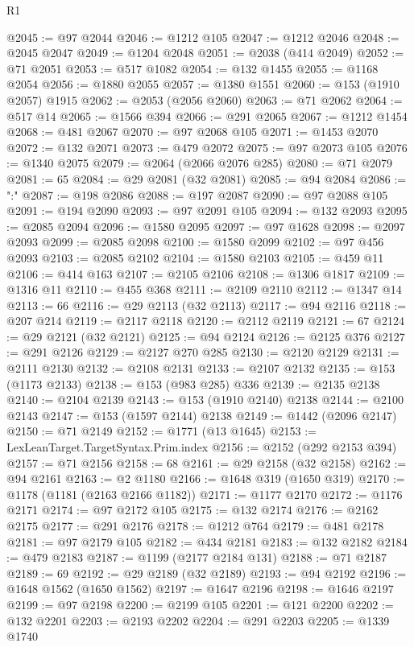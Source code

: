 \begin{lexlean}{R1}
\begin{coremodule}
@2045 := @97 @2044
@2046 := @1212 @105
@2047 := @1212 @2046
@2048 := @2045 @2047
@2049 := @1204 @2048
@2051 := @2038 (@414 @2049)
@2052 := @71 @2051
@2053 := @517 @1082
@2054 := @132 @1455
@2055 := @1168 @2054
@2056 := @1880 @2055
@2057 := @1380 @1551
@2060 := @153 (@1910 @2057) @1915
@2062 := @2053 (@2056 @2060)
@2063 := @71 @2062
@2064 := @517 @14
@2065 := @1566 @394
@2066 := @291 @2065
@2067 := @1212 @1454
@2068 := @481 @2067
@2070 := @97 @2068 @105
@2071 := @1453 @2070
@2072 := @132 @2071
@2073 := @479 @2072
@2075 := @97 @2073 @105
@2076 := @1340 @2075
@2079 := @2064 (@2066 @2076 @285)
@2080 := @71 @2079
@2081 := 65
@2084 := @29 @2081 (@32 @2081)
@2085 := @94 @2084
@2086 := ":"
@2087 := @198 @2086
@2088 := @197 @2087
@2090 := @97 @2088 @105
@2091 := @194 @2090
@2093 := @97 @2091 @105
@2094 := @132 @2093
@2095 := @2085 @2094
@2096 := @1580 @2095
@2097 := @97 @1628
@2098 := @2097 @2093
@2099 := @2085 @2098
@2100 := @1580 @2099
@2102 := @97 @456 @2093
@2103 := @2085 @2102
@2104 := @1580 @2103
@2105 := @459 @11
@2106 := @414 @163
@2107 := @2105 @2106
@2108 := @1306 @1817
@2109 := @1316 @11
@2110 := @455 @368
@2111 := @2109 @2110
@2112 := @1347 @14
@2113 := 66
@2116 := @29 @2113 (@32 @2113)
@2117 := @94 @2116
@2118 := @207 @214
@2119 := @2117 @2118
@2120 := @2112 @2119
@2121 := 67
@2124 := @29 @2121 (@32 @2121)
@2125 := @94 @2124
@2126 := @2125 @376
@2127 := @291 @2126
@2129 := @2127 @270 @285
@2130 := @2120 @2129
@2131 := @2111 @2130
@2132 := @2108 @2131
@2133 := @2107 @2132
@2135 := @153 (@1173 @2133)
@2138 := @153 (@983 @285) @336
@2139 := @2135 @2138
@2140 := @2104 @2139
@2143 := @153 (@1910 @2140) @2138
@2144 := @2100 @2143
@2147 := @153 (@1597 @2144) @2138
@2149 := @1442 (@2096 @2147)
@2150 := @71 @2149
@2152 := @1771 (@13 @1645)
@2153 := LexLeanTarget.TargetSyntax.Prim.index
@2156 := @2152 (@292 @2153 @394)
@2157 := @71 @2156
@2158 := 68
@2161 := @29 @2158 (@32 @2158)
@2162 := @94 @2161
@2163 := @2 @1180
@2166 := @1648 @319 (@1650 @319)
@2170 := @1178 (@1181 (@2163 @2166 @1182))
@2171 := @1177 @2170
@2172 := @1176 @2171
@2174 := @97 @2172 @105
@2175 := @132 @2174
@2176 := @2162 @2175
@2177 := @291 @2176
@2178 := @1212 @764
@2179 := @481 @2178
@2181 := @97 @2179 @105
@2182 := @434 @2181
@2183 := @132 @2182
@2184 := @479 @2183
@2187 := @1199 (@2177 @2184 @131)
@2188 := @71 @2187
@2189 := 69
@2192 := @29 @2189 (@32 @2189)
@2193 := @94 @2192
@2196 := @1648 @1562 (@1650 @1562)
@2197 := @1647 @2196
@2198 := @1646 @2197
@2199 := @97 @2198
@2200 := @2199 @105
@2201 := @121 @2200
@2202 := @132 @2201
@2203 := @2193 @2202
@2204 := @291 @2203
@2205 := @1339 @1740

\end{coremodule}
\end{lexlean}
